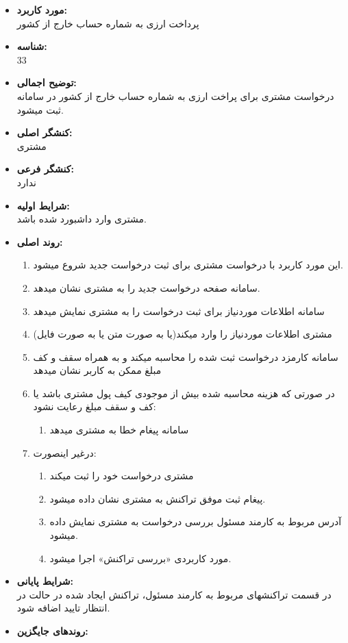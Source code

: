 \documentclass{article}
\begin{document}
\begin{itemize}
\item \textbf{مورد کاربرد:}\\
پرداخت ارزی به شماره حساب خارج از کشور
\item \textbf{شناسه:}\\
33
\item \textbf{توضیح اجمالی:}\\
درخواست مشتری برای پراخت ارزی به شماره حساب خارج از کشور در سامانه ثبت میشود.
\item \textbf{کنشگر اصلی:}\\
مشتری
\item \textbf{کنشگر فرعی:}\\
ندارد
\item \textbf{شرایط اولیه:}\\
مشتری وارد داشبورد شده باشد.
\item \textbf{روند اصلی:}\\
\begin{enumerate}
\item  این مورد کاربرد با درخواست مشتری برای ثبت درخواست جدید شروع میشود.
\item سامانه صفحه درخواست جدید را به مشتری نشان میدهد.
\item سامانه اطلاعات موردنیاز برای ثبت درخواست را به مشتری نمایش میدهد
\item مشتری اطلاعات موردنیاز را وارد میکند(یا به صورت متن یا به صورت فایل)
\item سامانه کارمزد درخواست ثبت شده را محاسبه میکند و به همراه سقف و کف مبلغ ممکن به کاربر نشان میدهد
\item در صورتی که هزینه محاسبه شده بیش از موجودی کیف پول مشتری باشد یا کف و سقف مبلغ رعایت نشود:
\begin{enumerate}
\item سامانه پیغام خطا به مشتری میدهد
\end{enumerate}
\item درغیر اینصورت:
\begin{enumerate}
\item مشتری درخواست خود را ثبت میکند
\item پیغام ثبت موفق تراکنش به مشتری نشان داده میشود.
\item آدرس مربوط به کارمند مسئول بررسی درخواست به مشتری نمایش داده میشود.
\item مورد کاربردی «بررسی تراکنش» اجرا میشود.
\end{enumerate}

\end{enumerate}

\item \textbf{شرایط پایانی:}\\ 
در قسمت تراکنشهای مربوط به کارمند مسئول، تراکنش ایجاد شده در حالت در انتظار تایید اضافه شود.
\item \textbf{روندهای جایگزین:}\\

\end{itemize}
\end{document}
